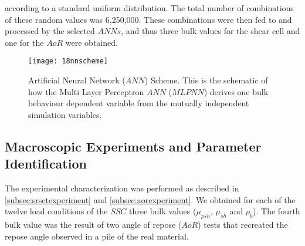 \documentclass[review]{elsarticle}
\begin{document}
according to a standard uniform distribution.
The total number of combinations of these random values was 6,250,000.
These combinations were then fed to and processed by the selected
$ANNs$, and thus three bulk values for the shear
cell and one for the $AoR$ were obtained.
\begin{figure}[!htb] 
\centering 
\texttt{[image: 18nnscheme]} 
\caption[ANN Scheme]{Artificial Neural Network ($ANN$) Scheme. This is the
schematic of how the Multi Layer Perceptron $ANN$ ($MLPNN$) derives one bulk
behaviour dependent variable from the mutually independent simulation variables.}
\label{fig:18nnscheme} 
\end{figure}

\subsection{Macroscopic Experiments and Parameter Identification}
\label{subsec:macroscopicexperimentsparameteridentification}
The experimental characterization was performed as described in
\ref{subsec:srsctexperiment} and \ref{subsec:aorexperiment}. 
We obtained for each of the twelve load conditions of the $SSC$ three bulk
values ($\mu_{psh}$, $\mu_{sh}$ and $\rho_b$).
The fourth bulk value was the result of two angle of repose ($AoR$) tests that
recreated the repose angle observed in a pile of the
real material. 
\end{document}
